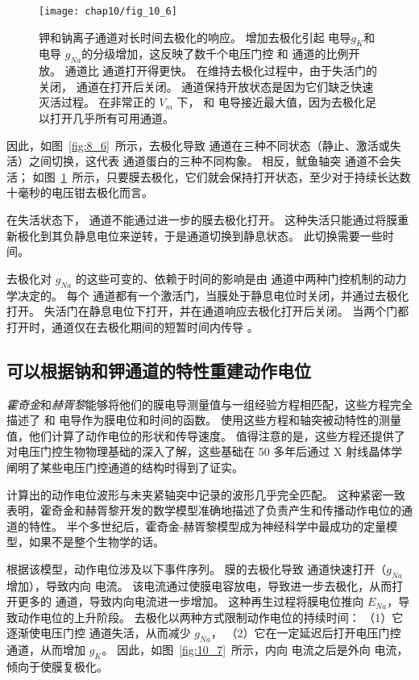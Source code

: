 \begin{figure}[htbp]
	\centering
	\texttt{[image: chap10/fig\_10\_6]}
	\caption{钾和钠离子通道对长时间去极化的响应。
		增加去极化引起  电导$g_K$和  电导 $g_{Na}$的分级增加，这反映了数千个电压门控  和  通道的比例开放。
		 通道比  通道打开得更快。
		在维持去极化过程中，由于失活门的关闭， 通道在打开后关闭。
		 通道保持开放状态是因为它们缺乏快速灭活过程。
		在非常正的 $V_m$ 下， 和  电导接近最大值，因为去极化足以打开几乎所有可用通道。}
	\label{fig:10_6}
\end{figure}


因此，如图~\ref{fig:8_6}~所示，去极化导致  通道在三种不同状态（静止、激活或失活）之间切换，这代表  通道蛋白的三种不同构象。
相反，鱿鱼轴突  通道不会失活；
如图~\ref{fig:10_6}~所示，只要膜去极化，它们就会保持打开状态，至少对于持续长达数十毫秒的电压钳去极化而言。


在失活状态下， 通道不能通过进一步的膜去极化打开。
这种失活只能通过将膜重新极化到其负静息电位来逆转，于是通道切换到静息状态。
此切换需要一些时间。


去极化对 $g_{Na}$ 的这些可变的、依赖于时间的影响是由  通道中两种门控机制的动力学决定的。
每个  通道都有一个激活门，当膜处于静息电位时关闭，并通过去极化打开。
失活门在静息电位下打开，并在通道响应去极化打开后关闭。
当两个门都打开时，通道仅在去极化期间的短暂时间内传导 。



\subsection{可以根据钠和钾通道的特性重建动作电位}

\textit{霍奇金}和\textit{赫胥黎}能够将他们的膜电导测量值与一组经验方程相匹配，这些方程完全描述了  和  电导作为膜电位和时间的函数。
使用这些方程和轴突被动特性的测量值，他们计算了动作电位的形状和传导速度。
值得注意的是，这些方程还提供了对电压门控生物物理基础的深入了解，这些基础在 50 多年后通过 X 射线晶体学阐明了某些电压门控通道的结构时得到了证实。


计算出的动作电位波形与未夹紧轴突中记录的波形几乎完全匹配。
这种紧密一致表明，霍奇金和赫胥黎开发的数学模型准确地描述了负责产生和传播动作电位的通道的特性。
半个多世纪后，霍奇金-赫胥黎模型成为神经科学中最成功的定量模型，如果不是整个生物学的话。


根据该模型，动作电位涉及以下事件序列。
膜的去极化导致  通道快速打开（$g_{Na}$ 增加），导致内向  电流。
该电流通过使膜电容放电，导致进一步去极化，从而打开更多的  通道，导致内向电流进一步增加。 
这种再生过程将膜电位推向 $E_{Na}$，导致动作电位的上升阶段。
去极化以两种方式限制动作电位的持续时间：
（1）它逐渐使电压门控  通道失活，从而减少 $g_{Na}$，
（2）它在一定延迟后打开电压门控  通道，从而增加 $g_K$。
因此，如图~\ref{fig:10_7}~所示，内向  电流之后是外向  电流，倾向于使膜复极化。


